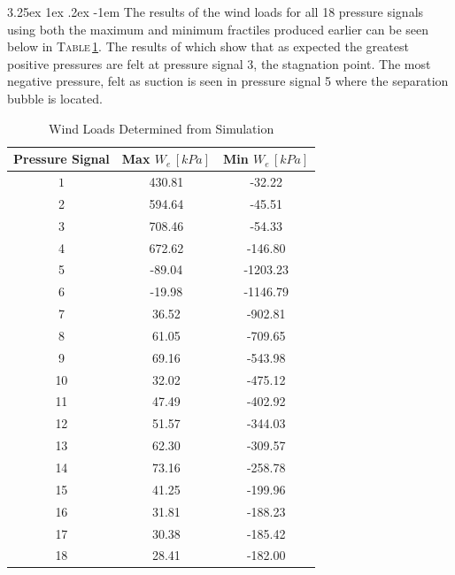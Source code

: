 \documentclass[11pt,a4paper,titlepage]{report}
\makeatletter
\renewcommand\paragraph{\@startsection{paragraph}{5}{\z@}%
  {3.25ex \@plus1ex \@minus.2ex}%
  {-1em}%
  {\normalfont\normalsize\bfseries}}
\makeatother
\begin{document}
\paragraph{}The results of the wind loads for all 18 pressure signals using both the maximum and minimum fractiles produced earlier can be seen below in \textsc{Table}\,\ref{tab:wind load sim}. The results of which show that as expected the greatest positive pressures are felt at pressure signal 3, the stagnation point. The most negative pressure, felt as suction is seen in pressure signal 5 where the separation bubble is located. 
\begin{table}[h]
    \centering
    \begin{tabular}{c|c|c}
       Pressure Signal & Max $W_e\,[kPa]$ & Min $W_e\,[kPa]$ \\
       \hline
    $1$  & 430.81 & -32.22   \\
   2 &  594.64 & -45.51   \\
 3 & 708.46 & -54.33   \\
4 & 672.62 & -146.80  \\
5 & -89.04 & -1203.23 \\
6 & -19.98 & -1146.79 \\
7 & 36.52  & -902.81  \\
8 & 61.05  & -709.65  \\
9 & 69.16  & -543.98  \\
10 & 32.02  & -475.12  \\
11 & 47.49  & -402.92  \\
12 & 51.57  & -344.03  \\
13 & 62.30  & -309.57  \\
14 & 73.16  & -258.78  \\
15 & 41.25  & -199.96  \\
16 & 31.81  & -188.23  \\
17 & 30.38  & -185.42  \\
18 & 28.41  & -182.00 
    \end{tabular}
    \caption{Wind Loads Determined from Simulation}
    \label{tab:wind load sim}
\end{table}
\end{document}
